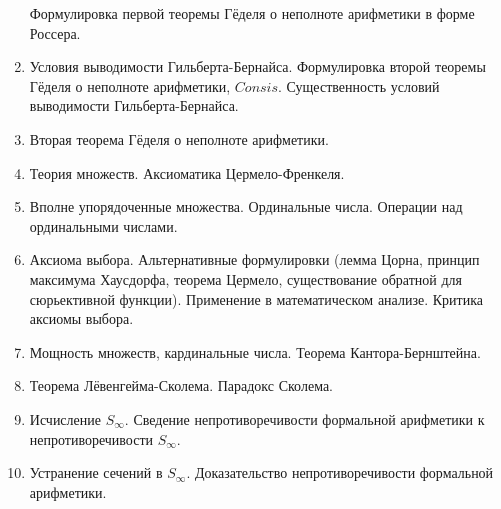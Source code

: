 \documentclass[11pt,a4paper,oneside]{scrartcl}
\begin{document}
\begin{enumerate}
Формулировка первой теоремы Гёделя о неполноте арифметики в форме Россера.
\item Условия выводимости Гильберта-Бернайса. Формулировка второй теоремы Гёделя о неполноте арифметики, 
$Consis$. Существенность условий выводимости Гильберта-Бернайса. 
\item Вторая теорема Гёделя о неполноте арифметики.
\item Теория множеств. Аксиоматика Цермело-Френкеля.
\item Вполне упорядоченные множества. Ординальные числа. Операции над ординальными числами.
\item Аксиома выбора. Альтернативные формулировки (лемма Цорна, принцип 
максимума Хаусдорфа, теорема Цермело, существование обратной для сюрь\-ективной функции). 
Применение в математическом анализе. Критика аксиомы выбора.
\item Мощность множеств, кардинальные числа. Теорема Кантора-Бернштейна. 
\item Теорема Лёвенгейма-Сколема. Парадокс Сколема.
\item Исчисление $S_\infty$. Сведение непротиворечивости формальной арифметики к не\-про\-ти\-воречивости $S_\infty$.
\item Устранение сечений в $S_\infty$. Доказательство непротиворечивости формальной арифметики.
\end{enumerate}
\end{document}
